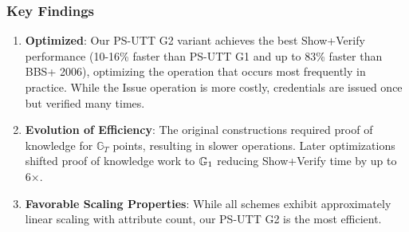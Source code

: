 \subsubsection{Key Findings}
\begin{enumerate}
    \item \textbf{Optimized}: Our PS-UTT G2 variant achieves the best Show+Verify performance (10-16\% faster than PS-UTT G1 and up to 83\% faster than BBS+ 2006), optimizing the operation that occurs most frequently in practice. While the Issue operation is more costly, credentials are issued once but verified many times.
    
    \item \textbf{Evolution of Efficiency}: The original constructions \cite{hutchison_constant-size_2006, sako_short_2016} required proof of knowledge for $\mathbb{G}_T$ points, resulting in slower operations. Later optimizations \cite{camenisch_anonymous_2016, tomescu2022utt} shifted proof of knowledge work to $\mathbb{G}_1$ reducing Show+Verify time by up to 6×.
    
    \item \textbf{Favorable Scaling Properties}: While all schemes exhibit approximately linear scaling with attribute count, our PS-UTT G2 is the most efficient.
\end{enumerate}



































